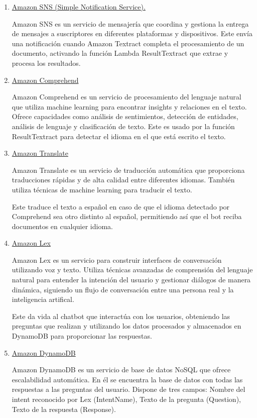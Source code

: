 \begin{enumerate}
    \item \underline{Amazon SNS (Simple Notification Service).}

    Amazon SNS es un servicio de mensajería que coordina y gestiona la entrega de mensajes a suscriptores en diferentes plataformas y dispositivos.  Este envía una notificación cuando Amazon Textract completa el procesamiento de un documento, activando la función Lambda ResultTextract que extrae y procesa los resultados.
    
    \item \underline{Amazon Comprehend}

    Amazon Comprehend es un servicio de procesamiento del lenguaje natural que utiliza machine learning para encontrar insights y relaciones en el texto. Ofrece capacidades como análisis de sentimientos, detección de entidades, análisis de lenguaje y clasificación de texto. Este es usado por la función ResultTextract para detectar el idioma en el que está escrito el texto.
    
    \item \underline{Amazon Translate}

    Amazon Translate es un servicio de traducción automática que proporciona traducciones rápidas y de alta calidad entre diferentes idiomas. También utiliza técnicas de machine learning para traducir el texto.

    Este traduce el texto a español en caso de que el idioma detectado por Comprehend sea otro distinto al español, permitiendo así que el bot reciba documentos en cualquier idioma.
    
    \item \underline{Amazon Lex}

    Amazon Lex es un servicio para construir interfaces de conversación utilizando voz y texto. Utiliza técnicas avanzadas de comprensión del lenguaje natural para entender la intención del usuario y gestionar diálogos de manera dinámica, siguiendo un flujo de conversación entre una persona real y la inteligencia artifical.

    Este da vida al chatbot que interactúa con los usuarios, obteniendo las preguntas que realizan y utilizando los datos procesados y almacenados en DynamoDB para proporcionar las respuestas. 
    \item \underline{Amazon DynamoDB}

    Amazon DynamoDB es un servicio de base de datos NoSQL que ofrece escalabilidad automática. En él se encuentra la base de datos con todas las respuestas a las preguntas del usuario. Dispone de tres campos: Nombre del intent reconocido por Lex (IntentName), Texto de la pregunta (Question), Texto de la respuesta (Response). 
    

\end{enumerate}
